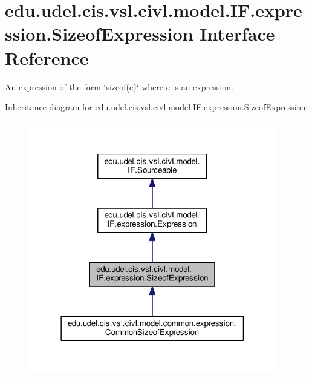 \hypertarget{interfaceedu_1_1udel_1_1cis_1_1vsl_1_1civl_1_1model_1_1IF_1_1expression_1_1SizeofExpression}{}\section{edu.\+udel.\+cis.\+vsl.\+civl.\+model.\+I\+F.\+expression.\+Sizeof\+Expression Interface Reference}
\label{interfaceedu_1_1udel_1_1cis_1_1vsl_1_1civl_1_1model_1_1IF_1_1expression_1_1SizeofExpression}


An expression of the form \char`\"{}sizeof(e)\char`\"{} where e is an expression.  




Inheritance diagram for edu.\+udel.\+cis.\+vsl.\+civl.\+model.\+I\+F.\+expression.\+Sizeof\+Expression\+:
\nopagebreak
\begin{figure}[H]
\begin{center}
\leavevmode
\includegraphics[width=306pt]{interfaceedu_1_1udel_1_1cis_1_1vsl_1_1civl_1_1model_1_1IF_1_1expression_1_1SizeofExpression__inherit__graph}
\end{center}
\end{figure}


